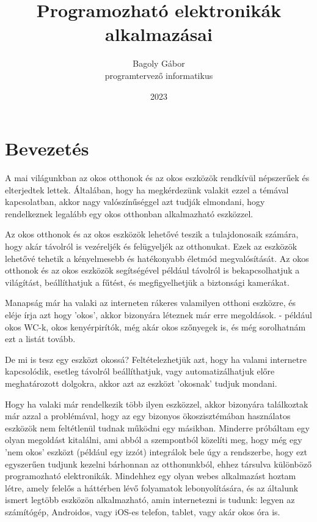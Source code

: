 \documentclass[
]{thesis-ekf}
\theoremstyle{definition}
\theoremstyle{remark}
\begin{document}
	\title{Programozható elektronikák alkalmazásai}
	\author{Bagoly Gábor\\programtervező informatikus}
	\date{2023}
	\maketitle
	\tableofcontents
	
	\chapter*{Bevezetés}
	
	A mai világunkban az okos otthonok és az okos eszközök rendkívül népszerűek és elterjedtek lettek. Általában, hogy ha megkérdezünk valakit ezzel a témával kapcsolatban, akkor nagy valószínűséggel azt tudják elmondani, hogy rendelkeznek legalább egy okos otthonban alkalmazható eszközzel.
	
	Az okos otthonok és az okos eszközök lehetővé teszik a tulajdonosaik számára, hogy akár távolról is vezéreljék és felügyeljék az otthonukat. Ezek az eszközök lehetővé tehetik a kényelmesebb és hatékonyabb életmód megvalósítását. Az okos otthonok és az okos eszközök segítségével például távolról is bekapcsolhatjuk a világítást, beállíthatjuk a fűtést, és megfigyelhetjük a biztonsági kamerákat.
	
	Manapság már ha valaki az interneten rákeres valamilyen otthoni eszközre, és eléje írja azt hogy 'okos', akkor bizonyára léteznek már erre megoldások. - például okos WC-k, okos kenyérpirítók, még akár okos szőnyegek is, és még sorolhatnám ezt a listát tovább. 
	
	De mi is tesz egy eszközt okossá? Feltételezhetjük azt, hogy ha valami internetre kapcsolódik, esetleg távolról beállíthatjuk, vagy automatizálhatjuk előre meghatározott dolgokra, akkor azt az eszközt 'okosnak' tudjuk mondani.
	
	Hogy ha valaki már rendelkezik több ilyen eszközzel, akkor bizonyára találkoztak már azzal a problémával, hogy az egy bizonyos ökoszisztémában használatos eszközök nem feltétlenül tudnak működni egy másikban. Minderre próbáltam egy olyan megoldást kitalálni, ami abból a szempontból közelíti meg, hogy még egy 'nem okos' eszközt (például egy izzót) integrálok bele úgy a rendszerbe, hogy ezt egyszerűen tudjunk kezelni bárhonnan az otthonunkból, ehhez társulva különböző programozható elektronikák. Mindehhez egy olyan webes alkalmazást hoztam létre, amely felelős a háttérben lévő folyamatok lebonyolítására, és az általunk ismert legtöbb eszközön alkalmazható, amin internetezni is tudunk: legyen az számítógép, Androidos, vagy iOS-es telefon, tablet, vagy akár okos óra is.
	
\end{document}
